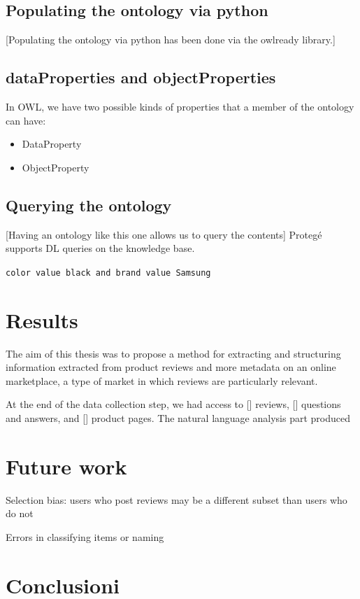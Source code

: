 \documentclass[LaM,binding=0.6cm]{sapthesis}
\begin{document}
\section{Populating the ontology via python}

[Populating the ontology via python has been done via the owlready library.]

\section{dataProperties and objectProperties}

In OWL, we have two possible kinds of properties that a member of the ontology can have:
\begin{itemize}
	\item DataProperty
	\item ObjectProperty
\end{itemize}

\section{Querying the ontology}

[Having an ontology like this one allows us to query the contents]
Protegé supports DL queries on the knowledge base.

\texttt{color value black and brand value Samsung}

\chapter{Results}

The aim of this thesis was to propose a method for extracting and structuring information extracted from product reviews and more metadata on an online marketplace, a type of market in which reviews are particularly relevant.

At the end of the data collection step, we had access to [] reviews, [] questions and answers, and [] product pages. The natural language analysis part produced



\chapter{Future work}



Selection bias: users who post reviews may be a different subset than users who do not

Errors in classifying items or naming

\chapter{Conclusioni}


\backmatter
\cleardoublepage
{}
\end{document}
